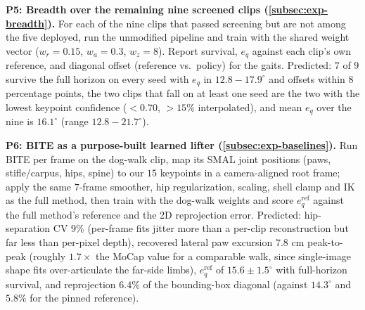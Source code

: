 \textbf{P5: Breadth over the remaining nine screened clips (\autoref{subsec:exp-breadth}).} For each of the nine clips that passed screening but are not among the five deployed, run the unmodified pipeline and train with the shared weight vector ($w_r{=}0.15$, $w_a{=}0.3$, $w_z{=}8$). Report survival, $e_q$ against each clip's own reference, and diagonal offset (reference vs.\ policy) for the gaits. Predicted: $7$ of $9$ survive the full horizon on every seed with $e_q$ in $12.8-17.9^\circ$ and offsets within $8$ percentage points, the two clips that fall on at least one seed are the two with the lowest keypoint confidence (${<}0.70$, ${>}15\%$ interpolated), and mean $e_q$ over the nine is $16.1^\circ$ (range $12.8-21.7^\circ$).

\textbf{P6: BITE as a purpose-built learned lifter (\autoref{subsec:exp-baselines}).} Run BITE \citep{rueegg2023bite} per frame on the dog-walk clip, map its SMAL joint positions (paws, stifle/carpus, hips, spine) to our $15$ keypoints in a camera-aligned root frame; apply the same $7$-frame smoother, hip regularization, scaling, shell clamp and IK as the full method, then train with the dog-walk weights and score $e_q^{\mathrm{ref}}$ against the full method's reference and the 2D reprojection error. Predicted: hip-separation CV $9\%$ (per-frame fits jitter more than a per-clip reconstruction but far less than per-pixel depth), recovered lateral paw excursion $7.8$ cm peak-to-peak (roughly $1.7\times$ the MoCap value for a comparable walk, since single-image shape fits over-articulate the far-side limbs), $e_q^{\mathrm{ref}}$ of $15.6\pm1.5^\circ$ with full-horizon survival, and reprojection $6.4\%$ of the bounding-box diagonal (against $14.3^\circ$ and $5.8\%$ for the pinned reference).